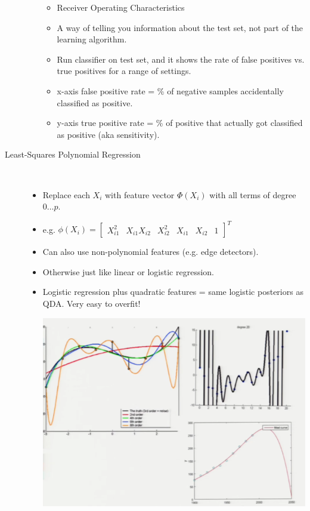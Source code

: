 \documentclass[10pt]{article}
\begin{document}
\begin{description}
\begin{itemize}
\begin{center}
						\end{center}
						\begin{itemize}
							\item Receiver Operating Characteristics 
							\item A way of telling you information about the test set, not part of the learning algorithm.
							\item Run classifier on test set, and it shows the rate of false positives vs. true positives for a range of settings.
							\item x-axis false positive rate = \% of negative samples accidentally classified as positive.
							\item y-axis true positive rate = \% of positive that actually got classified as positive (aka sensitivity).
						\end{itemize}
				\end{itemize}
				
				\item[Least-Squares Polynomial Regression]
				\
					\begin{itemize}
						\item Replace each $X_{i}$ with feature vector $\Phi(X_{i})$ with all terms of degree $0 \dots p$.
						\item e.g. $\phi(X_{i}) = \begin{bmatrix}
												X_{i1}^{2} & X_{i1}X_{i2} & X_{i2}^{2} & X_{i1} & X_{i2} & 1 
 											\end{bmatrix}^{T}
 											$
 						\item Can also use non-polynomial features (e.g. edge detectors).
 						\item Otherwise just like linear or logistic regression.
 						\item Logistic regression plus quadratic features = same logistic posteriors as QDA. Very easy to overfit!
							\begin{center}
								\includegraphics[scale=0.5]{images/polyregression}
							\end{center}
					\end{itemize}
\end{description}
\end{document}

